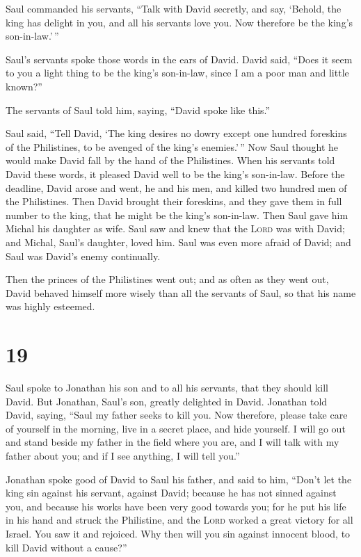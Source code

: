  Saul commanded his servants, ``Talk with David secretly,
and say, `Behold, the king has delight in you, and all his servants love
you. Now therefore be the king's son-in-law.'\,''

 Saul's servants spoke those words in the ears of David.
David said, ``Does it seem to you a light thing to be the king's
son-in-law, since I am a poor man and little known?''

 The servants of Saul told him, saying, ``David spoke
like this.''

 Saul said, ``Tell David, `The king desires no dowry
except one hundred foreskins of the Philistines, to be avenged of the
king's enemies.'\,'' Now Saul thought he would make David fall by the
hand of the Philistines.  When his servants told David
these words, it pleased David well to be the king's son-in-law. Before
the deadline,  David arose and went, he and his men, and
killed two hundred men of the Philistines. Then David brought their
foreskins, and they gave them in full number to the king, that he might
be the king's son-in-law. Then Saul gave him Michal his daughter as
wife.  Saul saw and knew that the \textsc{Lord} was with
David; and Michal, Saul's daughter, loved him.  Saul was
even more afraid of David; and Saul was David's enemy continually.

 Then the princes of the Philistines went out; and as
often as they went out, David behaved himself more wisely than all the
servants of Saul, so that his name was highly esteemed.

\hypertarget{section-18}{%
\section{19}\label{section-18}}

 Saul spoke to Jonathan his son and to all his servants,
that they should kill David. But Jonathan, Saul's son, greatly delighted
in David.  Jonathan told David, saying, ``Saul my father
seeks to kill you. Now therefore, please take care of yourself in the
morning, live in a secret place, and hide yourself.  I
will go out and stand beside my father in the field where you are, and I
will talk with my father about you; and if I see anything, I will tell
you.''

 Jonathan spoke good of David to Saul his father, and said
to him, ``Don't let the king sin against his servant, against David;
because he has not sinned against you, and because his works have been
very good towards you;  for he put his life in his hand
and struck the Philistine, and the \textsc{Lord} worked a great victory
for all Israel. You saw it and rejoiced. Why then will you sin against
innocent blood, to kill David without a cause?''

